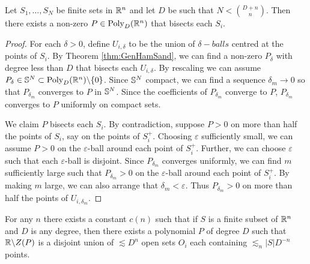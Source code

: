 \begin{corollary}
    Let $S_1, \dots , S_N$ be finite sets in $\mathbb R^n$ and let $D$ be such that $N < {{D+n}\choose{n}}$. 
    Then there exists a non-zero $P\in \text{Poly}_D (\mathbb R^n)$ that bisects each $S_i$.  \label{thm:FiniteHamSandwich} 
\end{corollary}

\begin{proof}
    For each $\delta>0$, define $U_{i, \delta}$ to be the union of $\delta-balls$ centred at the points of $S_i$. 
    By Theorem \ref{thm:GenHamSand}, we can find a non-zero $P_{\delta}$ with degree less than $D$ that bisects each $U_{i, \delta}$. 
    By rescaling we can assume $P_{\delta} \in \mathbb S^N \subset \text{Poly}_D (\mathbb R^n) \backslash \{0\}$.
    Since $\mathbb S^N$ compact, we can find a sequence $\delta_m \to 0$ so that $P_{\delta_{m}}$ converges to $P$ in $\mathbb S^N$.
    Since the coefficients of $P_{\delta_{m}}$ converge to $P$, $P_{\delta_{m}}$ converges to $P$ uniformly on compact sets.

    We claim $P$ bisects each $S_i$. 
    By contradiction, suppose $P>0$ on more than half the points of $S_i$, say on the points of $S_i^+$. 
    Choosing $\varepsilon$ sufficiently small, we can assume $P>0$ on the $\varepsilon$-ball around each point of $S_i^+$.
    Further, we can choose $\varepsilon$ such that each $\varepsilon$-ball is disjoint. 
    Since $P_{\delta_{m}}$ converges uniformly, we can find $m$ sufficiently large such that $P_{\delta_{m}}>0$ 
    on the $\varepsilon$-ball around each point of $S_i^+$.
    By making $m$ large, we can also arrange that $\delta_m < \varepsilon$.
    Thus $P_{\delta_{m}} > 0$ on more than half the points of $U_{i, \delta_{m}}$.
\end{proof}

\begin{theorem}
    For any $n$ there exists a constant $c(n)$ such that if $S$ is a finite subset of $\mathbb R^n$ and $D$ is any degree, then there exists
    a polynomial $P$ of degree $D$ such that $\mathbb R \backslash Z(P)$ is a disjoint union of $\lesssim D^n$ open sets $O_i$ each containing
    $\lesssim_n |S|D^{-n}$ points. \label{thm:PolyPartioning}
 \end{theorem}
 
